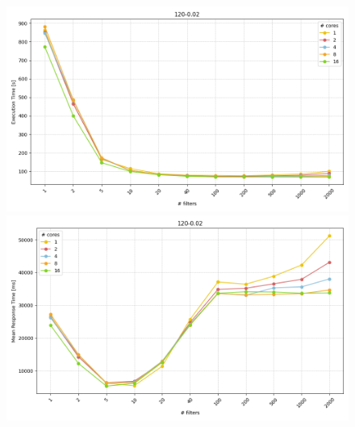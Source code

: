 \documentclass[12pt,a4paper]{article}
\begin{document}
\begin{figure}[H]
    \centering
    \hspace*{-3cm} %
    \begin{minipage}{0.5\textwidth}
        \centering
        \includegraphics[scale=0.4]{../processed/NRT/small/checks/120-0.02/combined/execTime-1.png}
        \caption*{}
    \end{minipage}
    \hspace{0.16\textwidth}
    \begin{minipage}{0.5\textwidth}
        \centering
        \includegraphics[scale=0.4]{../processed/NRT/small/checks/120-0.02/combined/mrt-1.png}
        \caption*{}
    \end{minipage}
    
    \vspace{0.5cm} %


\end{figure}
\end{document}
